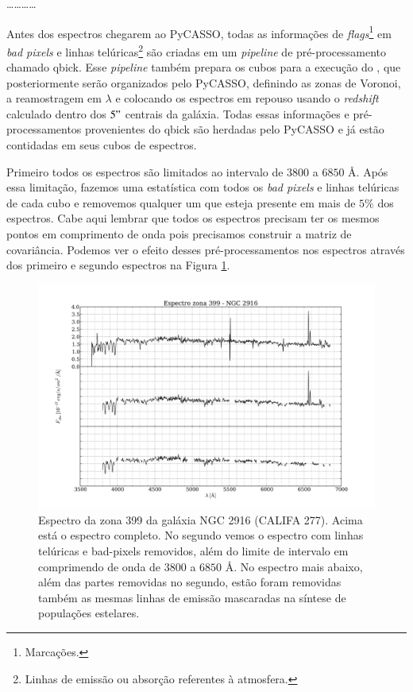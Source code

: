 \ldots \dots \ldots \ldots
                                                                                                                                                                                                                                                                               
Antes dos espectros chegarem ao PyCASSO, todas as informações de {\em flags}\footnote{Marcações.} em {\em bad pixels} e
linhas telúricas\footnote{Linhas de emissão ou absorção referentes à atmosfera.} são criadas em um {\em pipeline} de
pré-processamento chamado {\sc qbick}. Esse {\em pipeline} também prepara os cubos para a execução do \starlight, que
posteriormente serão organizados pelo PyCASSO, definindo as zonas de Voronoi, a reamostragem em $\lambda$ e colocando os
espectros em repouso usando o {\em redshift} calculado dentro dos $5"$ centrais da galáxia. Todas essas informações e
pré-processamentos provenientes do {\sc qbick} são herdadas pelo PyCASSO e já estão contidadas em seus cubos de
espectros.

Primeiro todos os espectros são limitados ao intervalo de $3800$ a $6850$ \AA. Após essa limitação, fazemos uma
estatística com todos os {\em bad pixels} e linhas telúricas de cada cubo e removemos qualquer um que esteja presente em
mais de $5\%$ dos espectros. Cabe aqui lembrar que todos os espectros precisam ter os mesmos pontos em comprimento de
onda pois precisamos construir a matriz de covariância. Podemos ver o efeito desses pré-processamentos nos espectros
através dos primeiro e segundo espectros na Figura \ref{fig:checkmask}.

\begin{figure}
    \includegraphics[width=1.0\textwidth]{figuras/K0277-constant_inital_mask-399.pdf}
    \caption[Exemplo de máscaras em um espectro do cubo de dados.]
    {Espectro da zona 399 da galáxia NGC 2916 (CALIFA 277). Acima está o espectro completo. No segundo vemos o espectro
    com linhas telúricas e bad-pixels removidos, além do limite de intervalo em comprimendo de onda de $3800$ a $6850$
    \AA. No espectro mais abaixo, além das partes removidas no segundo, estão foram removidas também as mesmas linhas de
    emissão mascaradas na síntese de populações estelares.}
    \label{fig:checkmask}
\end{figure}

